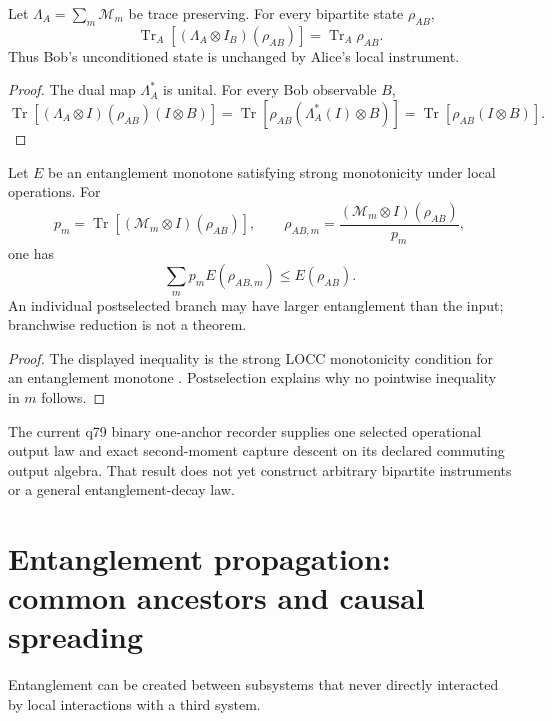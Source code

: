 \documentclass[11pt]{article}
\newcommand{\Tr}{\operatorname{Tr}}
\begin{document}
\begin{proposition}\label{prop:nosignal}
Let $\Lambda_A=\sum_m\mathcal M_m$ be trace preserving.  For every bipartite
state $\rho_{AB}$,
\[
\Tr_A\!\left[(\Lambda_A\otimes I_B)(\rho_{AB})\right]
=\Tr_A\rho_{AB}.
\]
Thus Bob's unconditioned state is unchanged by Alice's local instrument.
\end{proposition}

\begin{proof}
The dual map $\Lambda_A^\ast$ is unital.  For every Bob observable $B$,
\[
 \Tr\!\left[(\Lambda_A\otimes I)(\rho_{AB})(I\otimes B)\right]
 =\Tr\!\left[\rho_{AB}(\Lambda_A^\ast(I)\otimes B)\right]
 =\Tr\!\left[\rho_{AB}(I\otimes B)\right].
\]
\end{proof}

\begin{proposition}\label{prop:partial}
Let $E$ be an entanglement monotone satisfying strong monotonicity under
local operations.  For
\[
 p_m=\Tr[(\mathcal M_m\otimes I)(\rho_{AB})],
 \qquad
 \rho_{AB,m}=\frac{(\mathcal M_m\otimes I)(\rho_{AB})}{p_m},
\]
one has
\[
 \sum_m p_m E(\rho_{AB,m})\le E(\rho_{AB}).
\]
An individual postselected branch may have larger entanglement than the
input; branchwise reduction is not a theorem.
\end{proposition}

\begin{proof}
The displayed inequality is the strong LOCC monotonicity condition for an
entanglement monotone \cite{Vidal2000}.  Postselection explains why no
pointwise inequality in $m$ follows.
\end{proof}

The current q79 binary one-anchor recorder supplies one selected operational
output law and exact second-moment capture descent on its declared commuting
output algebra.  That result does not yet construct arbitrary bipartite
instruments or a general entanglement-decay law.

\section{Entanglement propagation: common ancestors and causal spreading}

Entanglement can be created between subsystems that never directly interacted by local interactions with a third system.
\end{document}
